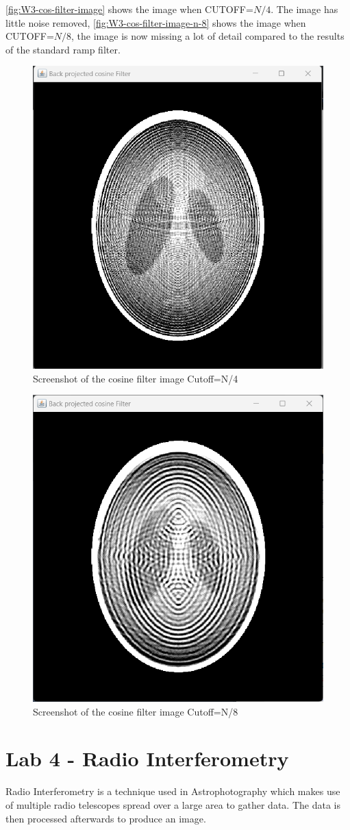 \autoref{fig:W3-cos-filter-image} shows the image when CUTOFF=$N/4$. The image has little noise removed,
\autoref{fig:W3-cos-filter-image-n-8} shows the image when CUTOFF=$N/8$, the image is now missing a lot of detail compared to the results of the standard ramp filter. 
\begin{figure}[H] 
    \centering
    \includegraphics[width=0.49\columnwidth]{Figures/Week 3/filter-cos-image.png}
    \caption{Screenshot of the cosine filter image Cutoff=N/4}
    \label{fig:W3-cos-filter-image}
\end{figure}
\begin{figure}[H] 
    \centering
    \includegraphics[width=0.49\columnwidth]{Figures/Week 3/filter-cos-image-N-8.png}
    \caption{Screenshot of the cosine filter image Cutoff=N/8}
    \label{fig:W3-cos-filter-image-n-8}
\end{figure}


\newpage
\section{Lab 4 - Radio Interferometry}

Radio Interferometry is a technique used in Astrophotography which makes use of multiple radio telescopes spread over a large area to gather data. The data is then processed afterwards to produce an image.

